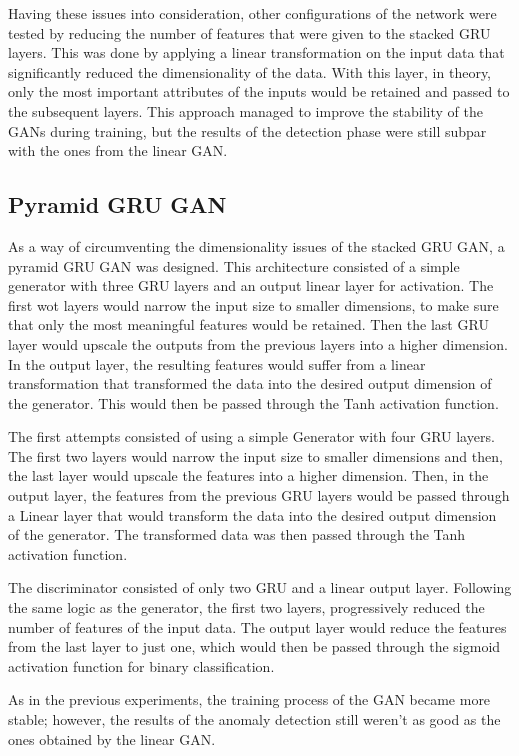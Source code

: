 Having these issues into consideration, other configurations of the network were tested by reducing the number of features that were given to the stacked GRU layers. This was done by applying a linear transformation on the input data that significantly reduced the dimensionality of the data. With this layer, in theory, only the most important attributes of the inputs would be retained and passed to the subsequent layers. This approach managed to improve the stability of the GANs during training, but the results of the detection phase were still subpar with the ones from the linear GAN.

\subsection{Pyramid GRU GAN}\label{sec:pyramid_gru_gan}

As a way of circumventing the dimensionality issues of the stacked GRU GAN, a pyramid GRU GAN was designed. This architecture consisted of a simple generator with three GRU layers and an output linear layer for activation.
The first wot layers would narrow the input size to smaller dimensions, to make sure that only the most meaningful features would be retained. Then the last GRU layer would upscale the outputs from the previous layers into a higher dimension. In the output layer, the resulting features would suffer from a linear transformation that transformed the data into the desired output dimension of the generator. This would then be passed through the Tanh activation function.

The first attempts consisted of using a simple Generator with four GRU layers. The first two layers would narrow the input size to smaller dimensions and then, the last layer would upscale the features into a higher dimension. Then, in the output layer, the features from the previous GRU layers would be passed through a Linear layer that would transform the data into the desired output dimension of the generator. The transformed data was then passed through the Tanh activation function. 

The discriminator consisted of only two GRU and a linear output layer. Following the same logic as the generator, the first two layers, progressively reduced the number of features of the input data. The output layer would reduce the features from the last layer to just one, which would then be passed through the sigmoid activation function for binary classification.

As in the previous experiments, the training process of the GAN became more stable; however, the results of the anomaly detection still weren't as good as the ones obtained by the linear GAN.


